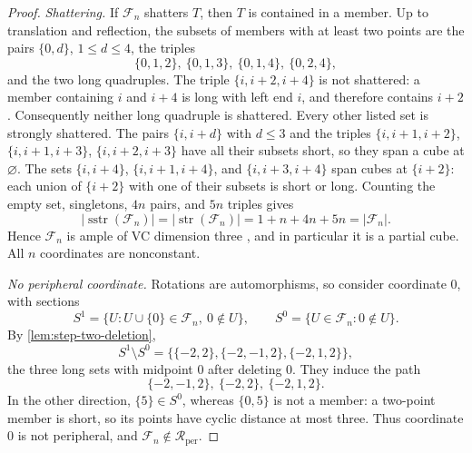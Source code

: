 \documentclass[11pt]{article}
\theoremstyle{definition}
\theoremstyle{remark}
\newcommand{\Rper}{\mathcal R_{\mathrm{per}}}
\newcommand{\strc}{\operatorname{str}}
\newcommand{\sstrc}{\operatorname{sstr}}
\begin{document}
\begin{proof}
\emph{Shattering.}  If \(\mathcal F_n\) shatters \(T\), then \(T\) is
contained in a member.  Up to translation and reflection, the subsets of
members with at least two points are the pairs \(\{0,d\}\), \(1\le d\le4\),
the triples
\[
 \{0,1,2\},\ \{0,1,3\},\ \{0,1,4\},\ \{0,2,4\},
\]
and the two long quadruples.  The triple \(\{i,i+2,i+4\}\) is not
shattered: a member containing \(i\) and \(i+4\) is long with left end
\(i\), and therefore contains \(i+2\).  Consequently neither long
quadruple is shattered.  Every other listed set is strongly shattered.
The pairs \(\{i,i+d\}\) with \(d\le3\) and the triples
\(\{i,i+1,i+2\}\), \(\{i,i+1,i+3\}\), \(\{i,i+2,i+3\}\) have all their
subsets short, so they span a cube at \(\varnothing\).  The sets
\(\{i,i+4\}\), \(\{i,i+1,i+4\}\), and \(\{i,i+3,i+4\}\) span cubes at
\(\{i+2\}\): each union of \(\{i+2\}\) with one of their subsets is short
or long.  Counting the empty set, singletons, \(4n\) pairs, and \(5n\)
triples gives
\[
 |\sstrc(\mathcal F_n)|=|\strc(\mathcal F_n)|=1+n+4n+5n=|\mathcal F_n|.
\]
Hence \(\mathcal F_n\) is ample of VC dimension three
\cite{BandeltCDK06}, and in particular it is a partial cube.  All \(n\)
coordinates are nonconstant.

\emph{No peripheral coordinate.}  Rotations are automorphisms, so consider
coordinate \(0\), with sections
\[
 S^1=\{U:U\cup\{0\}\in\mathcal F_n,\ 0\notin U\},\qquad
 S^0=\{U\in\mathcal F_n:0\notin U\}.
\]
By \cref{lem:step-two-deletion},
\[
 S^1\setminus S^0=\{\{-2,2\},\{-2,-1,2\},\{-2,1,2\}\},
\]
the three long sets with midpoint \(0\) after deleting \(0\).  They induce
the path
\[
 \{-2,-1,2\},\ \{-2,2\},\ \{-2,1,2\}.
\]  In the other direction,
\(\{5\}\in S^0\), whereas \(\{0,5\}\) is not a member: a two-point member is
short, so its points have cyclic distance at most three.  Thus
coordinate \(0\) is not peripheral, and \(\mathcal F_n\notin\Rper\).


\end{proof}
\end{document}
